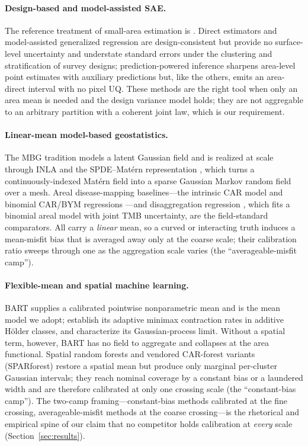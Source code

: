 \documentclass[11pt]{article}
\theoremstyle{remark}
\begin{document}
\paragraph{Design-based and model-assisted SAE.}
The reference treatment of small-area estimation is \citet{rao2015small}.
Direct estimators and model-assisted generalized regression are design-consistent
but provide no surface-level uncertainty and understate standard errors under
the clustering and stratification of survey designs; prediction-powered inference
\citep{angelopoulos2023ppi} sharpens area-level point estimates with auxiliary
predictions but, like the others, emits an area-direct interval with no pixel UQ.
These methods are the right tool when only an area mean is needed and the design
variance model holds; they are not aggregable to an arbitrary partition with a
coherent joint law, which is our requirement.

\paragraph{Linear-mean model-based geostatistics.}
The MBG tradition \citep{diggle1998mbg} models a latent Gaussian field and is
realized at scale through INLA \citep{rue2009inla} and the SPDE--Mat\'ern
representation \citep{lindgren2011spde}, which turns a continuously-indexed
Mat\'ern field into a sparse Gaussian Markov random field over a mesh. Areal
disease-mapping baselines---the intrinsic CAR model \citep{besag1991icar} and
binomial CAR/BYM regressions \citep{wakefield2007disease}---and disaggregation
regression \citep{nandi2023disaggregation}, which fits a binomial areal model
with joint TMB uncertainty, are the field-standard comparators. All carry a
\emph{linear} mean, so a curved or interacting truth induces a mean-misfit bias
that is averaged away only at the coarse scale; their calibration ratio sweeps
through one as the aggregation scale varies (the ``averageable-misfit camp'').

\paragraph{Flexible-mean and spatial machine learning.}
BART \citep{chipman2010bart} supplies a calibrated pointwise nonparametric mean
and is the mean model we adopt; \citet{jeong2023artofbart} establish its adaptive
minimax contraction rates in additive H\"older classes, and
\citet{petrillo2024bartgp} characterize its Gaussian-process limit. Without a
spatial term, however, BART has no field to aggregate and collapses at the area
functional. Spatial random forests \citep[RF-GLS;][]{saha2023rfgls} and vendored
CAR-forest variants (SPARforest) restore a spatial mean but produce only marginal
per-cluster Gaussian intervals; they reach nominal coverage by a constant bias or
a laundered width and are therefore calibrated at only one crossing scale (the
``constant-bias camp''). The two-camp framing---constant-bias methods calibrated
at the fine crossing, averageable-misfit methods at the coarse crossing---is the
rhetorical and empirical spine of our claim that no competitor holds calibration
at \emph{every} scale (Section~\ref{sec:results}).
\end{document}
